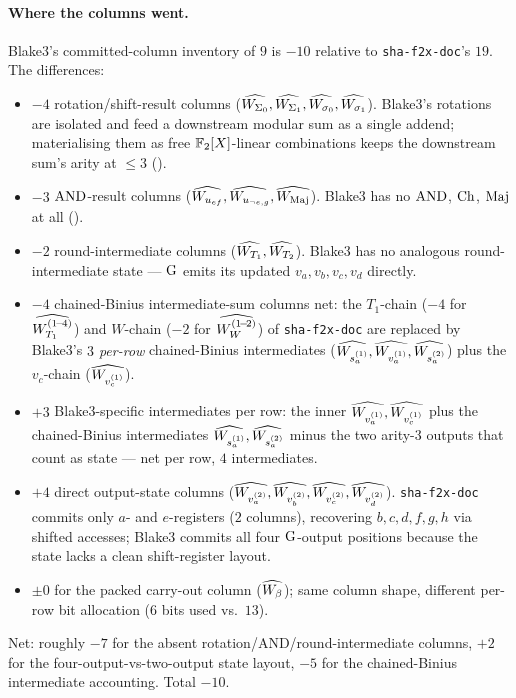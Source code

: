 \paragraph{Where the columns went.}
Blake3's committed-column inventory of $9$ is $-10$ relative to
\texttt{sha-f2x-doc}'s $19$. The differences:
\begin{itemize}[leftmargin=2em,topsep=2pt]
  \item $-4$ rotation/shift-result columns
        ($\widehat{W_{\Sigma_0}}, \widehat{W_{\Sigma_1}}, \widehat{W_{\sigma_0}},
        \widehat{W_{\sigma_1}}$). Blake3's rotations are isolated and feed
        a downstream modular sum as a single addend; materialising
        them as free $\mathbb{F}_2[X]$-linear combinations keeps the
        downstream sum's arity at $\le 3$
        ().
  \item $-3$ $\operatorname{AND}$-result columns
        ($\widehat{W_{u_{ef}}}, \widehat{W_{u_{\neg e, g}}}, \widehat{W_{\operatorname{Maj}}}$).
        Blake3 has no $\operatorname{AND}$, $\operatorname{Ch}$, $\operatorname{Maj}$ at all
        ().
  \item $-2$ round-intermediate columns ($\widehat{W_{T_1}}, \widehat{W_{T_2}}$).
        Blake3 has no analogous round-intermediate state — $\operatorname{G}$
        emits its updated $v_a, v_b, v_c, v_d$ directly.
  \item $-4$ chained-Binius intermediate-sum columns net: the
        $T_1$-chain ($-4$ for $\widehat{W_{T_1}^{(1\!-\!4)}}$) and
        $W$-chain ($-2$ for $\widehat{W_W^{(1\!-\!2)}}$) of
        \texttt{sha-f2x-doc} are replaced by Blake3's
        \emph{$3$ per-row} chained-Binius intermediates
        ($\widehat{W_{s_a^{(1)}}}, \widehat{W_{v_a^{(1)}}}, \widehat{W_{s_a^{(2)}}}$)
        plus the $v_c$-chain ($\widehat{W_{v_c^{(1)}}}$).
  \item $+3$ Blake3-specific intermediates per row: the inner
        $\widehat{W_{v_a^{(1)}}}, \widehat{W_{v_c^{(1)}}}$ plus the
        chained-Binius intermediates $\widehat{W_{s_a^{(1)}}},
        \widehat{W_{s_a^{(2)}}}$ minus the two arity-3 outputs that count
        as state — net per row, $4$ intermediates.
  \item $+4$ direct output-state columns ($\widehat{W_{v_a^{(2)}}},
        \widehat{W_{v_b^{(2)}}}, \widehat{W_{v_c^{(2)}}}, \widehat{W_{v_d^{(2)}}}$).
        \texttt{sha-f2x-doc} commits only $a$- and $e$-registers
        ($2$ columns), recovering $b, c, d, f, g, h$ via shifted
        accesses; Blake3 commits all four $\operatorname{G}$-output positions
        because the state lacks a clean shift-register layout.
  \item $\pm 0$ for the packed carry-out column ($\widehat{W_\beta}$);
        same column shape, different per-row bit allocation ($6$
        bits used vs.\ $13$).
\end{itemize}
Net: roughly $-7$ for the absent rotation/AND/round-intermediate
columns, $+2$ for the four-output-vs-two-output state layout, $-5$
for the chained-Binius intermediate accounting. Total $-10$.

